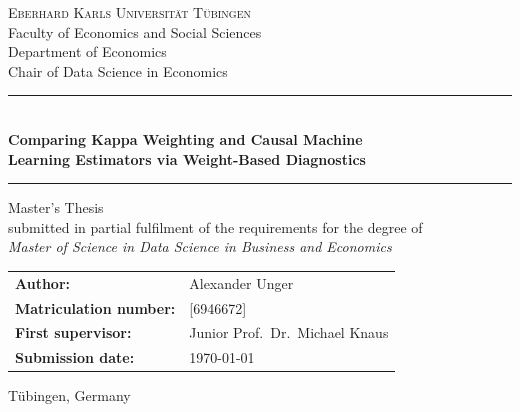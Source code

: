 \documentclass[12pt, a4paper, oneside]{article}
\theoremstyle{plain}
\theoremstyle{definition}
\begin{document}

\begin{titlepage}
  \thispagestyle{empty}
  \centering

  \vspace*{1.5cm}

  {\large \textsc{Eberhard Karls Universität Tübingen}}\\[0.3cm]
  {\large Faculty of Economics and Social Sciences}\\[0.1cm]
  {\normalsize Department of Economics}\\[0.1cm]
  {\normalsize Chair of Data Science in Economics}

  \vspace{1.5cm}

  \rule{\textwidth}{1.5pt}\\[0.4cm]
  {\LARGE \bfseries Comparing Kappa Weighting and Causal Machine \\[0.3cm]
   Learning Estimators via Weight-Based Diagnostics}\\[0.4cm]
  \rule{\textwidth}{1.5pt}

  \vspace{1.5cm}

  {\large Master's Thesis}\\[0.2cm]
  {\normalsize submitted in partial fulfilment of the requirements for the degree of}\\[0.2cm]
  {\large \textit{Master of Science in Data Science in Business and Economics}}

  \vspace{2.0cm}

  \begin{tabular}{ll}
    \textbf{Author:}     & Alexander Unger \\[0.2cm]
    \textbf{Matriculation number:} & [6946672] \\[0.2cm]
    \textbf{First supervisor:}  & Junior Prof.\ Dr.\ Michael Knaus \\[0.2cm]
    \textbf{Submission date:}   & \today \\
  \end{tabular}

  \vfill

  {\small Tübingen, Germany}

\end{titlepage}
\end{document}
